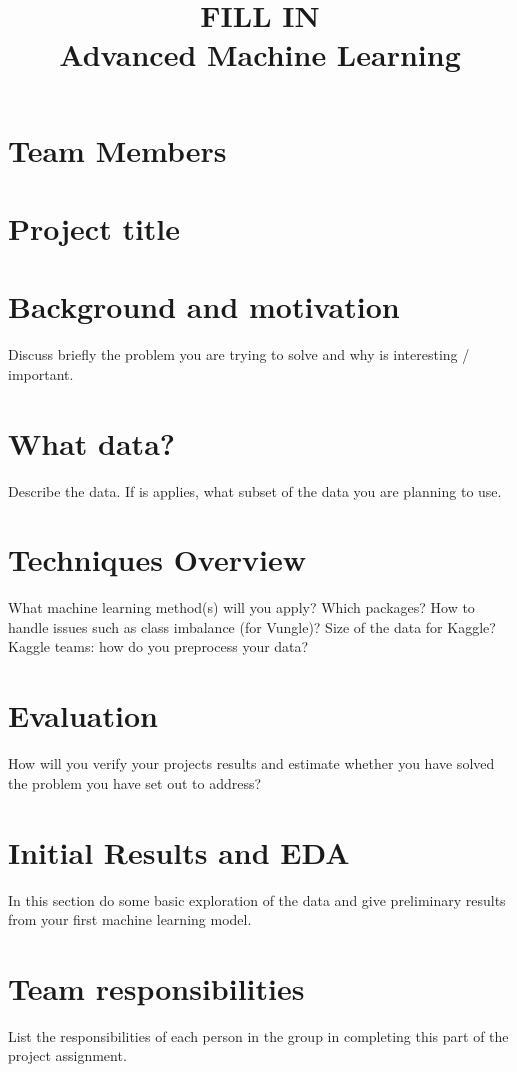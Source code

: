 \documentclass[11pt]{article}
\title{ FILL IN \\ Advanced Machine Learning}
\author{}
\date{}
\begin{document}
\maketitle

\section{Team Members}

\section{Project title}

\section{Background and motivation}
Discuss briefly the problem you are trying to solve and why is interesting / important. 

\section{What data?}
Describe the data. If is applies, what subset of the data you are planning to use. 

\section{Techniques Overview}
What machine learning method(s) will you apply? Which packages?
How to handle issues such as class imbalance (for Vungle)? Size of the data for Kaggle? 
Kaggle teams: how do you preprocess your data?

\section{Evaluation}
How will you verify your projects results and estimate whether you have solved the problem you have set out to address?

\section{Initial Results and EDA}
In this section do some basic exploration of the data and give preliminary results from your first machine learning model.

\section{Team responsibilities}
 
List the responsibilities of each person in the group in completing this part of the project assignment.
\end{document}
